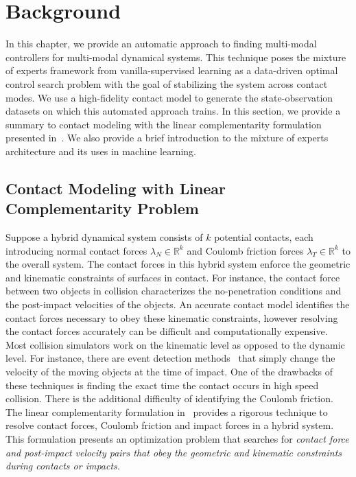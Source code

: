 
\section{Background}

In this chapter, we provide an automatic approach to finding multi-modal
controllers for multi-modal dynamical systems.
%
This technique poses the mixture of experts framework from vanilla-supervised
learning as a data-driven optimal control search problem with the goal of
stabilizing the system across contact modes.
%
We use a high-fidelity contact model to generate the state-observation datasets
on which this automated approach trains.
%
In this section, we provide a summary to contact modeling with the linear
complementarity formulation presented in~\cite{glocker2005formulation}.
%
We also provide a brief introduction to the mixture of experts architecture and
its uses in machine learning.
%

\subsection{Contact Modeling with Linear Complementarity Problem}

Suppose a hybrid dynamical system consists of $k$ potential contacts, each
introducing normal contact forces $\lambda_N \in \mathbb{R}^{k}$ and Coulomb
friction forces $\lambda_T \in \mathbb{R}^{k}$ to the overall system.
%
The contact forces in this hybrid system enforce the geometric and kinematic
constraints of surfaces in contact.
%
For instance, the contact force between two objects in collision characterizes
the no-penetration conditions and the post-impact velocities of the objects.
%
An accurate contact model identifies the contact forces necessary to obey these
kinematic constraints, however resolving the contact forces accurately can be
difficult and computationally expensive.
%
Most collision simulators work on the kinematic level as opposed to the dynamic
level.
%
For instance, there are event detection methods~\cite{cellier1986combined} that
simply change the velocity of the moving objects at the time of impact.
%
One of the drawbacks of these techniques is finding the exact time the contact
occurs in high speed collision.
%
There is the additional difficulty of identifying the Coulomb friction.
%
The linear complementarity formulation in~\cite{glocker2005formulation} provides
a rigorous technique to resolve contact forces, Coulomb friction and impact
forces in a hybrid system.
%
This formulation presents an optimization problem that searches for \it{contact force
and post-impact velocity} \normalfont pairs that obey the geometric and
kinematic constraints during contacts or impacts.
%

